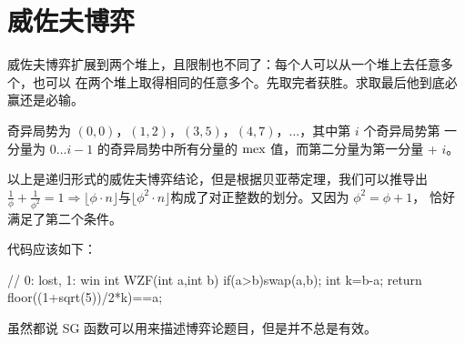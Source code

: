 \section{威佐夫博弈}
威佐夫博弈扩展到两个堆上，且限制也不同了：每个人可以从一个堆上去任意多个，也可以
在两个堆上取得相同的任意多个。先取完者获胜。求取最后他到底必赢还是必输。

奇异局势为 $(0,0)$，$(1,2)$，$(3,5)$，$(4,7)$，$\ldots$，其中第 $i$ 个奇异局势第
一分量为 $0\ldots i-1$ 的奇异局势中所有分量的 $\mathrm{mex}$ 值，而第二分量为第一分量 +
$i$。

以上是递归形式的威佐夫博弈结论，但是根据贝亚蒂定理，我们可以推导出 $\frac 1\phi
+ \frac 1{\phi^2} = 1 \Rightarrow \lfloor\phi \cdot n\rfloor \text{与} \lfloor
\phi^2 \cdot n\rfloor \text{构成了对正整数的划分}$。又因为 $\phi^2 = \phi + 1$，
恰好满足了第二个条件。

代码应该如下：
\begin{Cpp}
// 0: lost, 1: win
int WZF(int a,int b){
    if(a>b)swap(a,b);
    int k=b-a;
    return floor((1+sqrt(5))/2*k)==a;
}
\end{Cpp}

虽然都说 SG 函数可以用来描述博弈论题目，但是并不总是有效。


